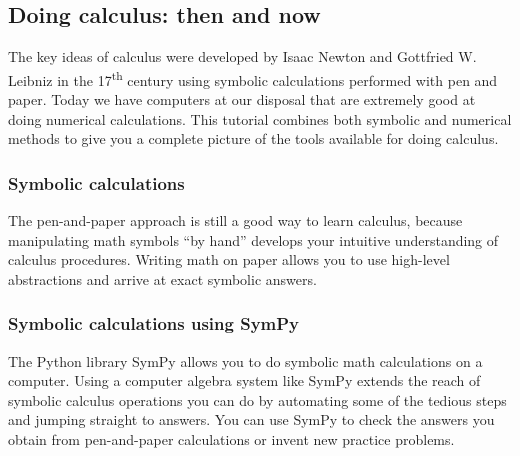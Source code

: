 	\subsection{Doing calculus: then and now}

		The key ideas of calculus were developed by Isaac Newton and Gottfried W. Leibniz
		in the 17\textsuperscript{th} century
		using symbolic calculations performed with pen and paper.
		Today we have computers at our disposal
		that are extremely good at doing numerical calculations.
		This tutorial combines both symbolic and numerical methods
		to give you a complete picture of the tools available for doing calculus.


		\subsubsection{Symbolic calculations}

			The pen-and-paper approach
			is still a good way to learn calculus,
			because manipulating math symbols ``by hand'' 
			develops your intuitive understanding of calculus procedures.
			Writing math on paper
			allows you to use high-level abstractions
			and arrive at exact symbolic answers.

		\subsubsection{Symbolic calculations using SymPy}

			The Python library SymPy allows you to do symbolic math calculations on a computer.
			Using a computer algebra system like SymPy extends
			the reach of symbolic calculus operations you can do
			by automating some of the tedious steps
			and jumping straight to answers.
			You can use SymPy to check the answers you obtain
			from pen-and-paper calculations
			or invent new practice problems.


